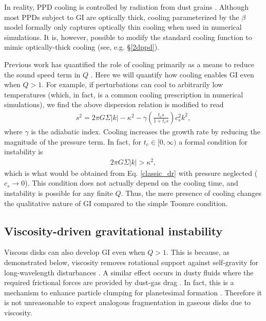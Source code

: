 \documentclass[iop, numberedappendix]{emulateapj}
\newcommand{\tcool}{t_\mathrm{c}}
\begin{document}
In reality, PPD cooling is controlled by radiation   
from dust grains \citep{bell94,dalessio97,chiang97}. Although most
PPDs subject to GI are optically thick, cooling parameterized by the
$\beta$ model formally only captures optically thin cooling when
used in numerical simulations. It is, however, possible to modify the
standard cooling function to mimic optically-thick cooling (see,
e.g. \S\ref{2dppd}).  

Previous work has quantified the role of cooling primarily as a means to reduce the sound speed term
in $Q$ \citep[though see e.g.,][]{clarke07}. Here we will quantify how cooling enables GI
even when $Q>1$. For example, if perturbations can
cool to arbitrarily low temperatures (which, in fact, is a common
cooling prescription in numerical simulations), we find the above
dispersion relation is  
modified to read 
\begin{align}\label{cool_dr}
s^2 = 2\pi G\Sigma |k| - \kappa^2 - \gamma \left(\frac{\tcool s}{1 +
  \tcool s}\right)c_s^2k^2,
\end{align}
where $\gamma$ is the adiabatic index. Cooling increases the growth
rate by reducing the magnitude of the 
pressure term. In fact, for $t_c\in[0,\infty)$ a formal condition
for instability is  
\begin{align*}
  2\pi G \Sigma |k| > \kappa^2,
\end{align*}
which is what would be obtained from Eq. \ref{classic_dr} with 
pressure neglected ($c_s\to 0$). This condition does not actually
depend on the cooling time, and instability is
possible for any finite $Q$. %
Thus, the mere presence of cooling changes the qualitative nature of
GI compared to the simple Toomre condition. 
   


\subsection{Viscosity-driven gravitational instability}\label{visc_gi}
Viscous disks can also develop GI even when $Q>1$. This is because, as 
demonstrated below, viscosity removes rotational support against  
self-gravity for long-wavelength disturbances 
\citep{lynden-bell74,willerding92,gammie96}. A similar effect   
occurs in dusty fluids where the required frictional forces are 
provided by dust-gas drag \citep{ward00, takahashi14}. 
In fact, this
is a mechanism to enhance particle clumping for planetesimal
formation %
\citep{youdin11}. Therefore it is not unreasonable to expect analogous
fragmentation in gaseous disks due to viscosity.   
\end{document}
